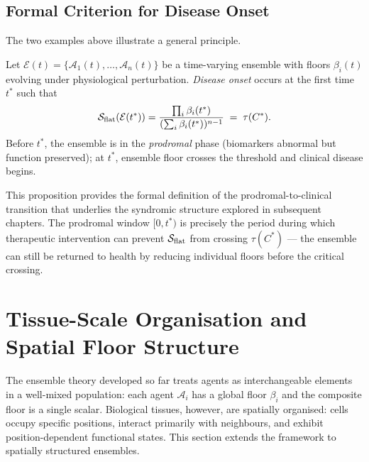 \subsection{Formal Criterion for Disease Onset}

The two examples above illustrate a general principle.

\begin{proposition}
\label{prop:ch02b-disease-onset}
Let $\mathcal{E}(t) = \{\mathcal{A}_1(t), \ldots, \mathcal{A}_n(t)\}$ be a
time-varying ensemble with floors $\beta_i(t)$ evolving under physiological
perturbation.  \emph{Disease onset} occurs at the first time $t^*$ such that
\begin{equation}
  \mathcal{S}_{\mathrm{flat}}(\mathcal{E}(t^*))
  = \frac{\prod_i \beta_i(t^*)}{(\sum_i \beta_i(t^*))^{n-1}}
  \;=\; \tau(C^*).
  \label{eq:ch02b-disease-onset}
\end{equation}
Before $t^*$, the ensemble is in the \emph{prodromal} phase (biomarkers
abnormal but function preserved); at $t^*$, ensemble floor crosses the
threshold and clinical disease begins.
\end{proposition}

This proposition provides the formal definition of the prodromal-to-clinical
transition that underlies the syndromic structure explored in subsequent
chapters.  The prodromal window $[0, t^*)$ is precisely the period during
which therapeutic intervention can prevent $\mathcal{S}_{\mathrm{flat}}$ from
crossing $\tau(C^*)$ — the ensemble can still be returned to health by
reducing individual floors before the critical crossing.

\section{Tissue-Scale Organisation and Spatial Floor Structure}
\label{sec:ch02b-tissue-organization}

The ensemble theory developed so far treats agents as interchangeable elements
in a well-mixed population: each agent $\mathcal{A}_i$ has a global floor
$\beta_i$ and the composite floor is a single scalar.  Biological tissues,
however, are spatially organised: cells occupy specific positions, interact
primarily with neighbours, and exhibit position-dependent functional states.
This section extends the framework to spatially structured ensembles.

